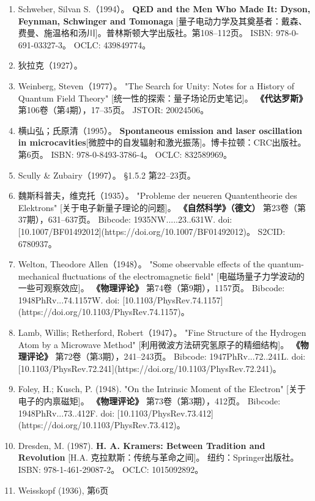 \begin{enumerate}
\item Schweber, Silvan S.（1994）。  
  \textbf{QED and the Men Who Made It: Dyson, Feynman, Schwinger and Tomonaga} [量子电动力学及其奠基者：戴森、费曼、施温格和汤川]。普林斯顿大学出版社。第108–112页。  
  ISBN: 978-0-691-03327-3。  
  OCLC: 439849774。  
\item 狄拉克（1927）。  
\item Weinberg, Steven（1977）。 
  "The Search for Unity: Notes for a History of Quantum Field Theory" [统一性的探索：量子场论历史笔记]。  
  \textbf{《代达罗斯》} 第106卷（第4期），17–35页。  
  JSTOR: 20024506。  
\item 横山弘；氏原清（1995）。  
  \textbf{Spontaneous emission and laser oscillation in microcavities}[微腔中的自发辐射和激光振荡]。博卡拉顿：CRC出版社。第6页。  
  ISBN: 978-0-8493-3786-4。  
  OCLC: 832589969。  
\item Scully & Zubairy（1997）。
  §1.5.2 第22–23页。  
\item 魏斯科普夫，维克托（1935）。  
  "Probleme der neueren Quantentheorie des Elektrons" [关于电子新量子理论的问题]。  
  \textbf{《自然科学》（德文）} 第23卷（第37期），631–637页。  
  Bibcode: 1935NW.....23..631W.  
  doi: [10.1007/BF01492012](https://doi.org/10.1007/BF01492012)。  
  S2CID: 6780937。  
\item Welton, Theodore Allen（1948）。  
  "Some observable effects of the quantum-mechanical fluctuations of the electromagnetic field" [电磁场量子力学波动的一些可观察效应]。  
  \textbf{《物理评论》} 第74卷（第9期），1157页。  
  Bibcode: 1948PhRv...74.1157W.  
  doi: [10.1103/PhysRev.74.1157](https://doi.org/10.1103/PhysRev.74.1157)。  
\item Lamb, Willis; Retherford, Robert（1947）。  
  "Fine Structure of the Hydrogen Atom by a Microwave Method" [利用微波方法研究氢原子的精细结构]。  
  \textbf{《物理评论》} 第72卷（第3期），241–243页。  
  Bibcode: 1947PhRv...72..241L.  
  doi: [10.1103/PhysRev.72.241](https://doi.org/10.1103/PhysRev.72.241)。  
\item Foley, H.; Kusch, P. (1948).  
  "On the Intrinsic Moment of the Electron" [关于电子的内禀磁矩]。  
  \textbf{《物理评论》} 第73卷（第3期），412页。  
  Bibcode: 1948PhRv...73..412F.  
  doi: [10.1103/PhysRev.73.412](https://doi.org/10.1103/PhysRev.73.412)。  
\item Dresden, M. (1987).  
  \textbf{H. A. Kramers: Between Tradition and Revolution} [H.A. 克拉默斯：传统与革命之间]。  
  纽约：Springer出版社。  
  ISBN: 978-1-461-29087-2。  
  OCLC: 1015092892。  
\item Weisskopf (1936), 第6页 


\end{enumerate}

